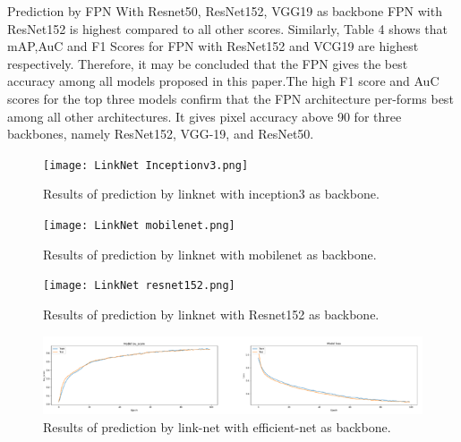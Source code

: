 \documentclass[a4paper,12pt]{spieman}  %
\begin{document}
\begin{spacing}{1}
Prediction by FPN With Resnet50, ResNet152, VGG19 as backbone FPN with ResNet152 is highest compared to all other scores. Similarly, Table 4 shows that mAP,AuC and F1 Scores for FPN with ResNet152 and VCG19 are highest respectively. Therefore, it may be concluded that the FPN gives the best accuracy among all models proposed in this paper.The high F1 score and AuC scores for the top three models confirm that the FPN architecture per-forms best among all other architectures. It gives pixel accuracy above 90%
for three backbones, namely ResNet152, VGG-19, and ResNet50. 
\begin{figure}[!h]
	\centering
 \texttt{[image: LinkNet Inceptionv3.png]}
	\caption{\label{fig:}Results of prediction by linknet with inception3 as backbone.}
 \texttt{[image: LinkNet mobilenet.png]}
    \caption{Results of prediction by linknet with mobilenet as backbone.}
 \texttt{[image: LinkNet resnet152.png]}
 \caption{Results of prediction by linknet with Resnet152 as backbone.}
 \includegraphics[width=\textwidth]{linknet-efficientnet.png}
    \caption{Results of prediction by link-net with efficient-net as backbone.}
   

\end{figure}
\end{spacing}
\end{document}
